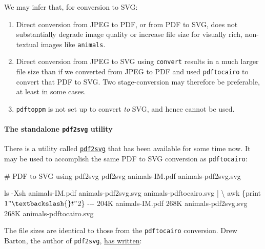 \documentclass[
  a4paper,
]{article}
\newenvironment{Shaded}{\begin{snugshade}}{\end{snugshade}}
\newcommand{\AttributeTok}[1]{\textcolor[rgb]{0.80,0.80,0.80}{#1}}
\newcommand{\CommentTok}[1]{\textcolor[rgb]{0.50,0.62,0.50}{#1}}
\newcommand{\DataTypeTok}[1]{\textcolor[rgb]{0.87,0.87,0.75}{#1}}
\newcommand{\ExtensionTok}[1]{\textcolor[rgb]{0.80,0.80,0.80}{#1}}
\newcommand{\FunctionTok}[1]{\textcolor[rgb]{0.94,0.94,0.56}{#1}}
\newcommand{\KeywordTok}[1]{\textcolor[rgb]{0.94,0.87,0.69}{#1}}
\newcommand{\NormalTok}[1]{\textcolor[rgb]{0.80,0.80,0.80}{#1}}
\newcommand{\StringTok}[1]{\textcolor[rgb]{0.80,0.58,0.58}{#1}}
\begin{document}
We may infer that, for conversion to SVG:

\begin{enumerate}
\item
  Direct conversion from JPEG to PDF, or from PDF to SVG, does not
  substantially degrade image quality or increase file size for visually
  rich, non-textual images like \texttt{animals}.
\item
  Direct conversion from JPEG to SVG using \texttt{convert} results in a
  much larger file size than if we converted from JPEG to PDF and used
  \texttt{pdftocairo} to convert that PDF to SVG. Two stage-conversion
  may therefore be preferable, at least in some cases.
\item
  \texttt{pdftoppm} is not set up to convert \emph{to} SVG, and hence
  cannot be used.
\end{enumerate}

\hypertarget{the-standalone-pdf2svg-utility}{%
\paragraph{\texorpdfstring{The standalone \texttt{pdf2svg}
utility}{The standalone pdf2svg utility}}\label{the-standalone-pdf2svg-utility}}

There is a utility called
\href{https://github.com/dawbarton/pdf2svg}{\texttt{pdf2svg}} that has
been available for some time now. It may be used to accomplish the same
PDF to SVG conversion as \texttt{pdftocairo}:

\begin{Shaded}
\begin{Highlighting}[]
\CommentTok{\# PDF to SVG using pdf2svg}
\ExtensionTok{pdf2svg}\NormalTok{ animals{-}IM.pdf animals{-}pdf2svg.svg}

\FunctionTok{ls} \AttributeTok{{-}Xsh}\NormalTok{ animals{-}IM.pdf animals{-}pdf2svg.svg animals{-}pdftocairo.svg }\KeywordTok{|} \DataTypeTok{\textbackslash{}}
\FunctionTok{awk} \StringTok{\textquotesingle{}\{print $1 "\textbackslash{}t" $2\}\textquotesingle{}}
\ExtensionTok{{-}{-}{-}}
\ExtensionTok{204K}\NormalTok{    animals{-}IM.pdf}
\ExtensionTok{268K}\NormalTok{    animals{-}pdf2svg.svg}
\ExtensionTok{268K}\NormalTok{    animals{-}pdftocairo.svg}
\end{Highlighting}
\end{Shaded}

The file sizes are identical to those from the \texttt{pdftocairo}
conversion. Drew Barton, the author of \texttt{pdf2svg},
\href{https://cityinthesky.co.uk/opensource/pdf2svg/}{has written}:
\end{document}
